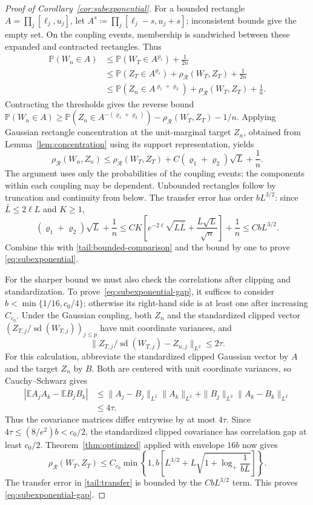 \documentclass[11pt,letterpaper]{article}
\theoremstyle{remark}
\newcommand{\E}{\mathbb E}
\newcommand{\Pp}{\mathbb P}
\newcommand{\rh}{\rho_{\mathcal R}}
\begin{document}
\begin{proof}[Proof of Corollary~\ref{cor:subexponential}]
For a bounded rectangle \(A=\prod_j[\ell_j,u_j]\), let
\(A^s\coloneqq\prod_j[\ell_j-s,u_j+s]\); inconsistent bounds
give the empty set. On the coupling events, membership is sandwiched
between these expanded and contracted rectangles. Thus
\begin{align*}
 \Pp(W_n\in A)
 &\le\Pp(W_T\in A^{\varrho_1})+\frac1{2n}\\
 &\le\Pp(Z_T\in A^{\varrho_1})+\rh(W_T,Z_T)+\frac1{2n}\\
 &\le\Pp(Z_n\in A^{\varrho_1+\varrho_2})+\rh(W_T,Z_T)+\frac1n.
\end{align*}
Contracting the thresholds gives the reverse bound
\(\Pp(W_n\in A)\ge\Pp(Z_n\in A^{-(\varrho_1+\varrho_2)})
-\rh(W_T,Z_T)-1/n\). Applying Gaussian rectangle concentration at
the unit-marginal target \(Z_n\), obtained from Lemma~\ref{lem:concentration}
using its support representation, yields
\begin{equation}
 \rh(W_n,Z_n)\le\rh(W_T,Z_T)
       +C(\varrho_1+\varrho_2)\sqrt L+\frac1n.
 \label{tail:transfer}
\end{equation}
The argument uses only the probabilities of the coupling events;
the components within each coupling may be dependent. Unbounded
rectangles follow by truncation and continuity from below.
The transfer error has order \(bL^{3/2}\): since
\(\bar L\le2\ell L\) and \(K\ge1\),
\[
 (\varrho_1+\varrho_2)\sqrt L+\frac1n
 \le CK\left[e^{-2\ell}\sqrt{L\bar L}
                     +\frac{\bar L\sqrt L}{\sqrt n}\right]+\frac1n
 \le CbL^{3/2}.
\]
Combine this with \eqref{tail:bounded-comparison} and the bound by one
to prove \eqref{eq:subexponential}.

For the sharper bound we must also check the correlations after
clipping and standardization. To prove~\eqref{eq:subexponential-gap},
it suffices to consider
\(b<\min\{1/16,c_0/4\}\); otherwise its right-hand side is at
least one after increasing \(C_{c_0}\).
Under the Gaussian coupling, both \(Z_n\) and the standardized clipped
vector \((Z_{T,j}/\operatorname{sd}(W_{T,j}))_{j\le p}\) have unit coordinate variances, and
\[
 \|Z_{T,j}/\operatorname{sd}(W_{T,j})-Z_{n,j}\|_{L^2}\le2\tau.
\]
For this calculation, abbreviate the standardized clipped Gaussian
vector by \(A\) and the target \(Z_n\) by \(B\). Both are centered
with unit coordinate variances, so Cauchy--Schwarz gives
\[
 \begin{aligned}
 |\E A_jA_k-\E B_jB_k|
 &\le\|A_j-B_j\|_{L^2}\|A_k\|_{L^2}
       +\|B_j\|_{L^2}\|A_k-B_k\|_{L^2}\\
 &\le4\tau.
 \end{aligned}
\]
Thus the covariance matrices differ entrywise by at most \(4\tau\). Since
\(4\tau\le(8/e^2)b<c_0/2\), the standardized clipped covariance
has correlation gap at least \(c_0/2\).
Theorem~\ref{thm:optimized} applied with envelope \(16b\) now gives
\[
 \rh(W_T,Z_T)\le C_{c_0}\min\left\{1,
 b\left[L^{3/2}+L\sqrt{1+\log_+\frac1{bL}}\right]\right\}.
\]
The transfer error in \eqref{tail:transfer} is bounded by the
\(CbL^{3/2}\) term. This proves \eqref{eq:subexponential-gap}.


\end{proof}
\end{document}
